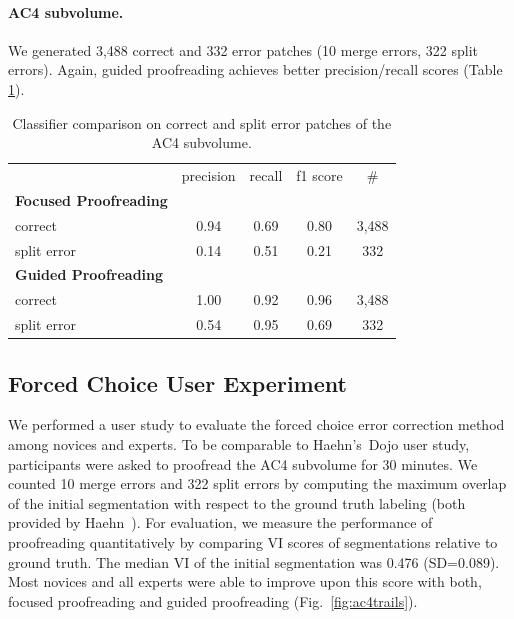 \paragraph{AC4 subvolume.} We generated 3,488 correct and 332 error patches (10 merge errors, 322 split errors). Again, guided proofreading achieves better precision/recall scores (Table \ref{tab:prac4}).

\begin{table}[h]
\caption{Classifier comparison on correct and split error patches of the AC4 subvolume.}%

\small{
\begin{tabular}{l|c|c|c|c}

 & precision & recall & f1 score & \# \\ 
\textbf{Focused Proofreading} & ~ & ~ & ~ & ~ \\ 
correct & 0.94 & 0.69 & 0.80 & 3,488 \\ 
split error & 0.14 & 0.51 & 0.21 & 332 \\ 
\textbf{Guided Proofreading} & ~ & ~ & ~ & ~ \\ 
correct & 1.00 & 0.92 & 0.96 & 3,488 \\ 
split error & 0.54 & 0.95 & 0.69 & 332 \\ 
\end{tabular} 
}
\label{tab:prac4}
\end{table}

\subsection{Forced Choice User Experiment}
We performed a user study to evaluate the forced choice error correction method among novices and experts. To be comparable to Haehn's~\etal Dojo user study, participants were asked to proofread the AC4 subvolume for 30 minutes. We counted 10 merge errors and 322 split errors by computing the maximum overlap of the initial segmentation with respect to the ground truth labeling (both provided by Haehn~\etal). For evaluation, we measure the performance of proofreading quantitatively by comparing VI scores of segmentations relative to ground truth. The median VI of the initial segmentation was 0.476 (SD=0.089). Most novices and all experts were able to improve upon this score with both, focused proofreading and guided proofreading (Fig.~\ref{fig:ac4trails}).

